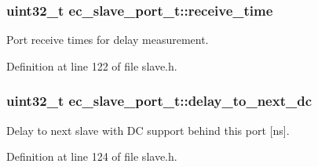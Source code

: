 \subsubsection[{receive\-\_\-time}]{\setlength{\rightskip}{0pt plus 5cm}uint32\-\_\-t {\bf ec\-\_\-slave\-\_\-port\-\_\-t\-::receive\-\_\-time}}\label{structec__slave__port__t_a4e7c3832a518186c4f1a5bc32a192eb9}


\-Port receive times for delay measurement. 



\-Definition at line 122 of file slave.\-h.

\subsubsection[{delay\-\_\-to\-\_\-next\-\_\-dc}]{\setlength{\rightskip}{0pt plus 5cm}uint32\-\_\-t {\bf ec\-\_\-slave\-\_\-port\-\_\-t\-::delay\-\_\-to\-\_\-next\-\_\-dc}}\label{structec__slave__port__t_ad9c8ad9fc7ebd5681eb72951b1716cc5}


\-Delay to next slave with \-D\-C support behind this port [ns]. 



\-Definition at line 124 of file slave.\-h.

